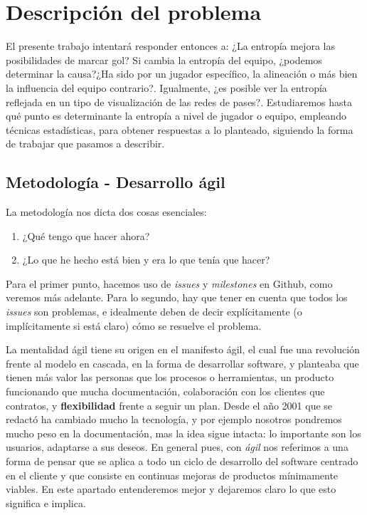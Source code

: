\chapter{Descripción del problema}
El presente trabajo intentará responder entonces a: ¿La entropía mejora las posibilidades 
de marcar gol? Si cambia la entropía del equipo, ¿podemos determinar la causa?¿Ha sido por un jugador 
específico, la alineación o más bien la influencia del equipo 
contrario?. Igualmente, ¿es posible ver la entropía reflejada en un tipo de visualización de 
las redes de pases?. Estudiaremos hasta qué punto es determinante la 
entropía a nivel de jugador o equipo, empleando técnicas estadísticas, para obtener respuestas a lo planteado, 
siguiendo la forma de trabajar que pasamos a describir.

\section{Metodología - Desarrollo ágil}
La metodología nos dicta dos cosas esenciales:
\begin{enumerate}
    \item ¿Qué tengo que hacer ahora?
    \item ¿Lo que he hecho está bien y era lo que tenía que hacer?
\end{enumerate}

Para el primer punto, hacemos uso de \textit{issues} y \textit{milestones} en Github, 
como veremos más adelante. Para lo segundo, hay que tener en cuenta que todos 
los \textit{issues} son problemas, e idealmente deben de decir explícitamente 
(o implícitamente si está claro) cómo se resuelve el problema.

La mentalidad ágil tiene su origen en el manifesto ágil\cite{manifiesto-agil}, el cual fue una revolución frente 
al modelo en cascada,
en la forma de desarrollar software, y planteaba que tienen más valor las personas que 
los procesos o herramientas, un producto funcionando que mucha documentación, colaboración 
con los clientes que contratos, y \textbf{flexibilidad} frente a seguir un plan. Desde el 
año 2001 que se redactó ha cambiado mucho la tecnología, y por ejemplo nosotros pondremos 
mucho peso en la documentación, mas la idea sigue intacta: lo importante son los usuarios, 
adaptarse a sus deseos. En general pues, con \textit{ágil} nos referimos a una forma de pensar que se aplica 
a todo un ciclo de desarrollo del software centrado en el cliente y que consiste en 
continuas mejoras de productos mínimamente viables\cite{agile-science}.
En este apartado entenderemos mejor y dejaremos claro lo que esto significa e implica.

